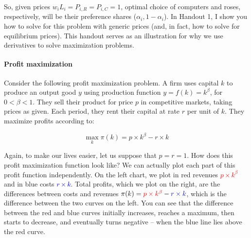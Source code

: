 \documentclass[11pt,letterpaper]{article}
\begin{document}
So, given prices $w_iL_i=P_{i,R}=P_{i,C}=1$, optimal choice of computers and roses, respectively, will be their preference shares ($\alpha_i,1-\alpha_i$). In Handout 1, I show you how to solve for this problem with generic prices (and, in fact, how to solve for equilibrium prices). This handout serves as an illustration for why we use derivatives to solve maximization problems.

\paragraph{Profit maximization} Consider the following profit maximization problem. A firm uses capital $k$ to produce an output good $y$ using production function $y=f(k)=k^{\beta}$, for $0<\beta <1$. They sell their product for price $p$ in competitive markets, taking prices as given. Each period, they rent their capital at rate $r$ per unit of $k$. They maximize profits according to:

\begin{equation*}
    \max_{k} \pi(k) = p\times k^{\beta} - r\times k
\end{equation*}

Again, to make our lives easier, let us suppose that $p=r=1$. How does this profit maximization function look like? We can actually plot each part of this profit function independently. On the left chart, we plot in red revenues \textcolor{red}{$p\times k^{\beta}$} and in blue costs \textcolor{blue}{$ r\times k$}. Total profits, which we plot on the right, are the differences between costs and revenues $ \pi(k) = \textcolor{red}{p\times k^{\beta}} - \textcolor{blue}{r\times k}$, which is the difference between the two curves on the left. You can see that the difference between the red and blue curves initially increases, reaches a maximum, then starts to decrease, and eventually turns negative -- when the blue line lies above the red curve.
\end{document}
